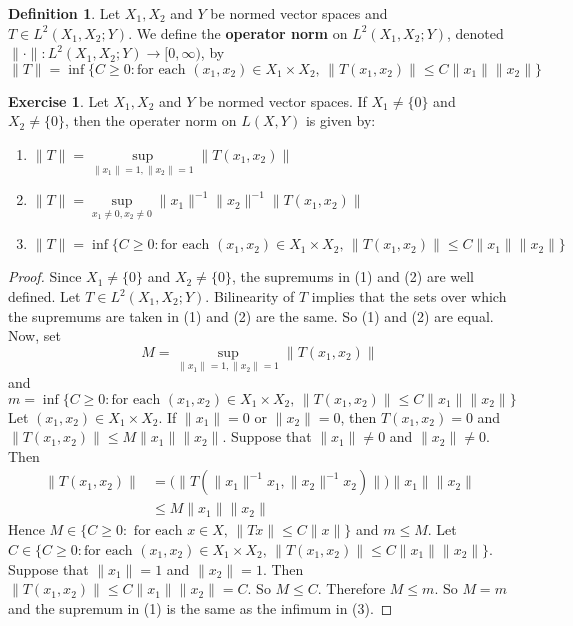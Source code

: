 \documentclass[12pt]{amsart}
\theoremstyle{definition}
\newtheorem{defn}[definition]{Definition}
\newtheorem{ex}[definition]{Exercise}
\newcommand{\tbf}[1]{\textbf{#1}}
\DeclareMathOperator*{\0}{\mbf{0}}
\DeclareMathOperator*{\1}{\mbf{1}}
\newcommand{\lex}[1]{\label{ex:#1}}
\newcommand{\ld}[1]{\label{defn:#1}}
\begin{document}
	\begin{defn} \ld{43005}
	Let $X_1, X_2$ and $Y$ be normed vector spaces and $T \in L^2(X_1, X_2;Y)$. We define the \tbf{operator norm} on $L^2(X_1, X_2;Y)$, denoted $\|\cdot\|: L^2(X_1, X_2; Y) \rightarrow [0, \infty)$, by  $$\|T\| =  \inf \{C \geq 0: \text{for each } (x_1, x_2) \in X_1 \times X_2\text{, } \|T(x_1, x_2) \|\leq C\|x_1\|\|x_2\|\}$$
	\end{defn}
	
	\begin{ex} \lex{42006}
		Let $X_1, X_2$ and $Y$ be normed vector spaces. If $X_1 \neq \{0\}$ and $ X_2 \neq \{0\}$, then the operater norm on $L(X,Y)$ is given by: 
		\begin{enumerate}
			\item $\|T\| = \sup\limits_{\|x_1\|=1 ,\|x_2\| = 1 }\|T(x_1, x_2)\|$
			\item $\|T\| = \sup\limits_{x_1 \neq 0, x_2 \neq 0 } \|x_1\|^{-1} \|x_2\|^{-1}\|T(x_1, x_2)\|$
			\item $\|T\| = \inf \{C \geq 0: \text{for each } (x_1, x_2) \in X_1 \times X_2\text{, } \|T(x_1, x_2) \|\leq C\|x_1\|\|x_2\|\}$
		\end{enumerate}
	\end{ex}
	
	\begin{proof} Since $X_1 \neq \{0\}$ and $ X_2 \neq \{0\}$, the supremums in (1) and (2) are well defined. Let $T \in L^2(X_1, X_2; Y)$. Bilinearity of $T$ implies that the sets over which the supremums are taken in (1) and (2) are the same. So (1) and (2) are equal.\\
		Now, set 
		$$M = \sup\limits_{\|x_1\|=1 ,\|x_2\| = 1 }\|T(x_1, x_2)\|$$ 
		and 
		$$m = \inf \{C \geq 0: \text{for each } (x_1, x_2) \in X_1 \times X_2\text{, } \|T(x_1, x_2) \|\leq C\|x_1\|\|x_2\|\}$$ 
		Let $(x_1,x_2) \in X_1 \times X_2$. If $\|x_1 \|=0$ or $\|x_2 \|=0$, then $T(x_1, x_2) = 0$ and $\|T(x_1, x_2) \|\leq M \|x_1 \| \|x_2\|$. Suppose that $\|x_1 \| \neq 0$ and $ \|x_2\|\neq 0$. Then 
		\begin{align*}
			\|T(x_1, x_2)\|
			&= \bigg(\big\|T(\|x_1\|^{-1} x_1, \|x_2\|^{-1} x_2 )\big\|\bigg)\|x_1 \| \|x_2\|\\
			& \leq M \|x_1\| \|x_2\|
		\end{align*}
		Hence $M \in \{C \geq 0: \text{ for each }x \in X\text{, } \|Tx \|\leq C \|x \|\}$ and $m \leq M$.
		Let $C \in \{C \geq 0: \text{for each } (x_1, x_2) \in X_1 \times X_2\text{, } \|T(x_1, x_2) \|\leq C\|x_1\|\|x_2\|\}$. Suppose that $\|x_1 \|=1$ and $\|x_2\| = 1$. Then $\| T (x_1, x_2) \| \leq C \|x_1 \| \|x_2 \|= C$. So $M \leq C$. Therefore $M \leq m$. So $M=m$ and the supremum in (1) is the same as the infimum in (3). 
	\end{proof}
	
\end{document}
